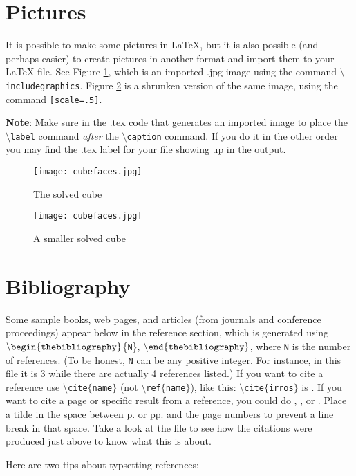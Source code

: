 \documentclass[12pt,letterpaper]{amsart}
\newcommand{\sm}{\setminus}
\newcommand{\pln}[1]{$\sm${\tt #1}}
\newcommand{\bgn}[1]{$\tt {\sm}begin\{#1\}$}
\newcommand{\nd}[1]{$\tt {\sm}end\{#1\}$}
\theoremstyle{plain}
\theoremstyle{definition}
\numberwithin{equation}{section}
\begin{document}
\section{Pictures}


It is possible to make some pictures in LaTeX, but it is also possible (and perhaps 
easier) to create pictures in another format and import them to your LaTeX file. 
See Figure \ref{cube}, which is an imported .jpg image using the command \pln{includegraphics}.  Figure \ref{cube2} is a shrunken version of the same image, using the command {\tt [scale=.5]}. 

{\bf Note}:  Make sure in the .tex code that generates an imported image to place the \pln{label} command {\it after} the \pln{caption} command. 
If you do it in the other order you may find the .tex label for your file showing up in the output.


\begin{figure}[ht]
   \center
    \texttt{[image: cubefaces.jpg]}
\caption{The solved cube}\label{cube}
\end{figure}


\begin{figure}[ht]
   \center
    \texttt{[image: cubefaces.jpg]}
\caption{A smaller solved cube}\label{cube2}
\end{figure}

\section{Bibliography}

Some sample books, web pages, and articles (from journals and conference 
proceedings) appear below in the reference section, which is generated using 
\bgn{thebibliography}\{{\tt N}\},
\nd{thebibliography}, 
where {\tt N} 
is the number of references.  (To be honest, 
{\tt N} can be any positive integer.  
For instance, in this file 
it is 3 while there are actually 4 references listed.)
If you want to cite a reference use 
\pln{cite}$\{${\tt name}$\}$ (not \pln{ref}$\{${\tt name}$\}$), 
like this: \pln{cite}$\{${\tt irros}$\}$ is \cite{irros}.  If you 
want to cite a page or specific result from a reference, you could do 
\cite[p.~340]{irros}, \cite[pp.~340--342]{irros}, or 
\cite[Theorem 20.1.1]{irros}. 
Place a tilde in the space between p. or pp. and the page 
numbers to prevent a line break in that space.  Take a look at the file 
to see how the citations were produced just above to know what this is about.

Here are two tips about typsetting references:
\end{document}
